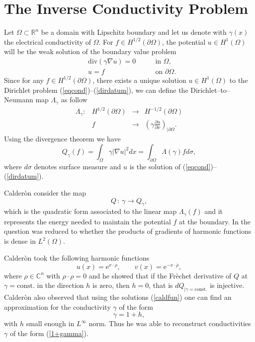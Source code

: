 \documentclass[10pt, a4paper, twoside, openright]{book}
\theoremstyle{definition}
\theoremstyle{plain}
\theoremstyle{plain}
\theoremstyle{plain}
\theoremstyle{plain}
\theoremstyle{plain}
\theoremstyle{plain}
\theoremstyle{plain}
\theoremstyle{plain}
\begin{document}
\section{The Inverse Conductivity Problem}
\label{globuniq}
Let $\Omega\subset\mathbb{R}^{n}$ be a domain with Lipschitz boundary and let
us denote with $\gamma(x)$ the electrical conductivity of $\Omega$.
For $f\in H^{1/2}(\partial\Omega)$,
the potential $u\in H^{1}(\Omega)$ will be the weak
solution of the boundary value problem
\begin{eqnarray}
\label{eqcond}
&\mathrm{div}(\gamma\nabla u)=0\qquad&\textrm{in }\Omega,\\
\label{dirdatum}
&u=f\qquad&\textrm{on }\partial\Omega.
\end{eqnarray}
Since for any $f\in H^{1/2}(\partial\Omega)$, there exists a unique solution $u\in H^{1}(\Omega)$
to the Dirichlet problem (\ref{eqcond})--(\ref{dirdatum}),
we can define the Dirichlet--to--Neumann map $\Lambda_{\gamma}$ as follow
\begin{equation}
\label{dirtoneum}
\begin{array}{cccc}
\Lambda_{\gamma}:&H^{1/2}(\partial\Omega)&\longrightarrow&H^{-1/2}(\partial\Omega)\\
&f&\longrightarrow&\left(\gamma\frac{\partial u}{\partial\nu}\right)_{|\partial\Omega}.
\end{array}
\end{equation}
Using the divergence theorem we have
\begin{equation}
\label{Qmap}
Q_{\gamma}(f)=\int_{\Omega}\gamma|\nabla u|^{2}dx
=\int_{\partial\Omega}\Lambda(\gamma)fd\sigma,
\end{equation}
where $d\sigma$ denotes surface measure and $u$ is the solution
of (\ref{eqcond})--(\ref{dirdatum}).

Calder\`on consider the map
\begin{equation}
\label{Q}
Q\,:\,\gamma\longrightarrow Q_{\gamma},
\end{equation}
which is the quadratic form associated to the linear map
$\Lambda_{\gamma}(f)$ and it represents
the energy needed to maintain the potential
$f$ at the boundary.
In \cite{Ca} the question was reduced to whether the products of gradients
of harmonic functions is dense in $L^{2}(\Omega)$.

Calder\`on
took the following harmonic functions
\begin{equation}
\label{caldfun}
u(x)=\mathrm{e}^{x\cdot\rho},\qquad v(x)=\mathrm{e}^{-x\cdot\overline{\rho}},
\end{equation}
where $\rho\in\mathbb{C}^{n}$ with $\rho\cdot\rho=0$ and he
showed that if the Fr\`echet derivative of $Q$
at $\gamma=\mathrm{const.}$ in the direction $h$ is zero,
then $h=0$, that is $dQ_{|\gamma=\mathrm{const.}}$ is injective.
Calder\`on also observed that using the solutions (\ref{caldfun})
one can find an approximation for the conductivity $\gamma$ of the form
\begin{equation}
\label{1+gamma}
\gamma=1+h,
\end{equation}
with $h$ small enough in $L^{\infty}$ norm.
Thus he was able to reconstruct conductivities $\gamma$ of the form (\ref{1+gamma}).
\end{document}
